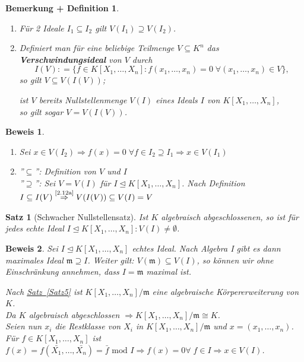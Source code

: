 \documentclass[a4paper,12pt]{scrbook}
\theoremstyle{break}
\newtheorem{BemDef}[Def]{Bemerkung + Definition}
\theoremstyle{nonumberbreak}
\newtheorem{Bew}{Beweis}
\newtheorem{nnSatz}{Satz}
\theoremstyle{nonumberplain}
\newcommand{\emp}[1]{\textbf{\emph{#1}}}
\newcommand{\defeqr}[0]{\mathrel{\mathop:}=}
\newcommand{\myref}[2]{%
\hyperref[#2]{#1~\ref*{#2}}%
}
\begin{document}
\begin{BemDef}
  \begin{enumerate}
    \item \label{2.12a}Für 2 Ideale $I_1 \subseteq I_2$ gilt $V(I_1) \supseteq V(I_2)$.
    \item Definiert man für eine beliebige Teilmenge $V \subseteq K^n$ das
      \emp{Verschwindungsideal} von $V$ durch
      $$I(V) \defeqr \{ f \in K[X_1,\dots, X_n]: f(x_1, \dots, x_n) = 0 \; \forall (x_1, \dots, x_n) \in V\},$$
      so gilt $V \subseteq V(I(V))$;

      ist $V$ bereits Nullstellenmenge $V(I)$ eines Ideals $I$ von $K[X_1, \dots, X_n]$,\\
      so gilt sogar $V = V(I(V))$.
  \end{enumerate}
\end{BemDef}

\begin{Bew}
  \begin{enumerate}
    \item Sei $x \in V(I_2) \Rightarrow f(x) = 0 \; \forall f \in I_2 \supseteq I_1 \Rightarrow x \in V(I_1)$
    \item ''$\subseteq$'': Definition von $V$ und $I$\\
          ''$\supseteq$'': Sei $V = V(I)$ für $I \trianglelefteq K[X_1, \dots, X_n]$.
	  Nach Definition $I \subseteq I(V) \overset{\text{\ref{2.12a}}}{\Rightarrow} V(I(V)) \subseteq V(I) = V$
  \end{enumerate}
\end{Bew}

\begin{nnSatz}[Schwacher Nullstellensatz]
\label{SatzSchwach}
  Ist $K$ algebraisch abgeschlossenen, so ist für jedes echte Ideal $I \trianglelefteq K[X_1, \dots, X_n]: V(I) \not= \emptyset$.
\end{nnSatz}

\begin{Bew}
  Sei $I \trianglelefteq K[X_1, \dots, X_n]$ echtes Ideal. Nach Algebra I gibt es dann maximales Ideal $\mathfrak{m} \supseteq I$. Weiter gilt: $V(\mathfrak{m}) \subseteq V(I)$, so können wir ohne Einschränkung annehmen, dass $I = \mathfrak{m}$ maximal ist.

  Nach \myref{Satz}{Satz5} ist $K[X_1, \dots, X_n]/\mathfrak{m}$ eine algebraische Körpererweiterung von $K$.\\
  Da $K$ algebraisch abgeschlossen $\Rightarrow K[X_1, \dots, X_n]/\mathfrak{m} \cong K$.\\
  Seien nun $x_i$ die Restklasse von $X_i$ in $K[X_1, \dots, X_n]/\mathfrak{m}$ und $x = (x_1, \dots, x_n)$.\\
  Für $f \in K[X_1, \dots, X_n]$ ist $f(x) = f(\bar{X_1}, \dots, \bar{X_n}) = \bar{f} \text{ mod } I \Rightarrow f(x) = 0 \forall \; f \in I \Rightarrow x \in V(I)$.
\end{Bew}
\end{document}
